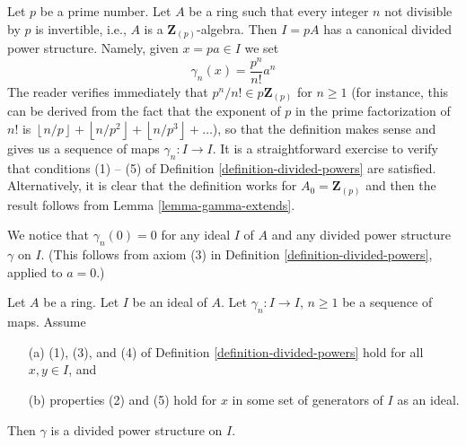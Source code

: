 \begin{example}
\label{example-ideal-generated-by-p}
Let $p$ be a prime number.
Let $A$ be a ring such that every integer $n$ not divisible by $p$
is invertible, i.e., $A$ is a $\mathbf{Z}_{(p)}$-algebra. Then
$I = pA$ has a canonical divided power structure. Namely, given
$x = pa \in I$ we set
$$
\gamma_n(x) = \frac{p^n}{n!} a^n
$$
The reader verifies immediately that $p^n/n! \in p\mathbf{Z}_{(p)}$
for $n \geq 1$ (for instance, this can be derived from the fact
that the exponent of $p$ in the prime factorization of $n!$ is
$\left\lfloor n/p \right\rfloor + \left\lfloor n/p^2 \right\rfloor
+ \left\lfloor n/p^3 \right\rfloor + \ldots$),
so that the definition makes sense and gives us a sequence of
maps $\gamma_n : I \to I$. It is a straightforward exercise to
verify that conditions (1) -- (5) of
Definition \ref{definition-divided-powers} are satisfied.
Alternatively, it is clear that the definition works for
$A_0 = \mathbf{Z}_{(p)}$ and then the result follows from
Lemma \ref{lemma-gamma-extends}.
\end{example}

\noindent
We notice that $\gamma_n\left(0\right) = 0$ for any ideal $I$ of
$A$ and any divided power structure $\gamma$ on $I$. (This follows
from axiom (3) in Definition \ref{definition-divided-powers},
applied to $a=0$.)

\begin{lemma}
\label{lemma-check-on-generators}
Let $A$ be a ring. Let $I$ be an ideal of $A$. Let $\gamma_n : I \to I$,
$n \geq 1$ be a sequence of maps. Assume
\begin{enumerate}
\item[(a)] (1), (3), and (4) of Definition \ref{definition-divided-powers}
hold for all $x, y \in I$, and
\item[(b)] properties (2) and (5) hold for $x$ in
some set of generators of $I$ as an ideal.
\end{enumerate}
Then $\gamma$ is a divided power structure on $I$.
\end{lemma}


